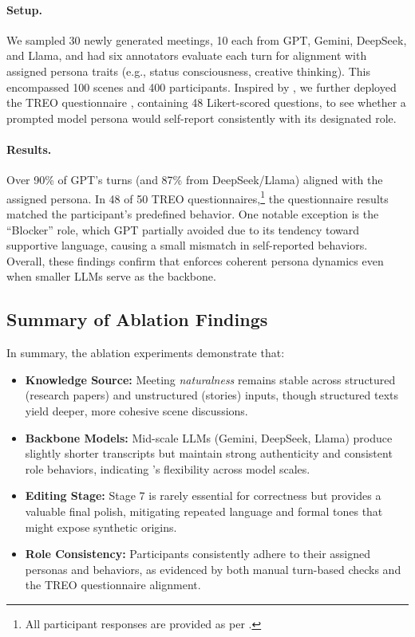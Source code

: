\paragraph{Setup.}
We sampled 30 newly generated meetings, 10 each from GPT, Gemini, DeepSeek, and Llama, and had six annotators evaluate each turn for alignment with assigned persona traits (e.g., status consciousness, creative thinking). This encompassed 100 scenes and 400 participants. Inspired by \citet{SerapioGarciaSCS23a}, we further deployed the TREO questionnaire \cite{MathieuTKD15}, containing 48 Likert-scored questions, to see whether a prompted model persona would self-report consistently with its designated role.

\paragraph{Results.}
Over 90\% of GPT’s turns (and 87\% from DeepSeek/Llama) aligned with the assigned persona. In 48 of 50 TREO questionnaires,\footnote{All participant responses are provided as per .} the questionnaire results matched the participant’s predefined behavior. One notable exception is the “Blocker” role, which GPT partially avoided due to its tendency toward supportive language, causing a small mismatch in self-reported behaviors. Overall, these findings confirm that \pipeline{} enforces coherent persona dynamics even when smaller LLMs serve as the backbone.


\subsection{Summary of Ablation Findings}
\label{sec:app_summary_findings}

In summary, the ablation experiments demonstrate that:

\begin{itemize}[leftmargin=1em]
    \item \textbf{Knowledge Source:} Meeting \emph{naturalness} remains stable across structured (research papers) and unstructured (stories) inputs, though structured texts yield deeper, more cohesive scene discussions.
    \item \textbf{Backbone Models:} Mid-scale LLMs (Gemini, DeepSeek, Llama) produce slightly shorter transcripts but maintain strong authenticity and consistent role behaviors, indicating \pipeline{}’s flexibility across model scales.
    \item \textbf{Editing Stage:} Stage 7 is rarely essential for correctness but provides a valuable final polish, mitigating repeated language and formal tones that might expose synthetic origins.
    \item \textbf{Role Consistency:} Participants consistently adhere to their assigned personas and behaviors, as evidenced by both manual turn-based checks and the TREO questionnaire alignment.
\end{itemize}

